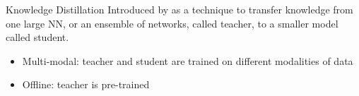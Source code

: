 \documentclass[compress,aspectratio=169,xcolor=table]{beamer}
\newcommand{\normalizeblocktitle}{\parbox{0pt}{\rule{0pt}{1em}}}
\begin{document}
\begin{frame}{Knowledge Distillation}
	Introduced by  as a technique to transfer knowledge from one large NN, or an ensemble of networks, called teacher, to a smaller model called student.

	\begin{itemize}
		\item Multi-modal: teacher and student are trained on different modalities of data
		\item Offline: teacher is pre-trained
	\end{itemize}

	\begin{figure}
	\end{figure}


\end{frame}
\end{document}
